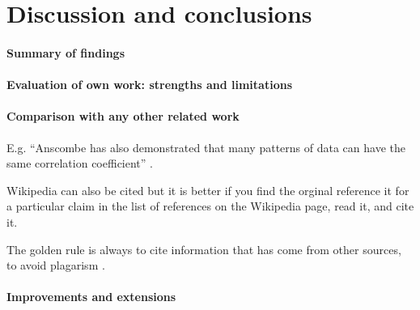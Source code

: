 \documentclass[11pt,a4paper]{article}
\begin{document}
\section{Discussion and conclusions}

\paragraph{Summary of findings}

\paragraph{Evaluation of own work: strengths and limitations}

\paragraph{Comparison with any other related work}
E.g. ``Anscombe has also demonstrated that many patterns of data can
have the same correlation coefficient'' \cite{Ansc73Grap}.

Wikipedia can also be cited but it is better if you find the orginal
reference it for a particular claim in the list of references on the
Wikipedia page, read it, and cite it.

The golden rule is always to cite information that has come from other
sources, to avoid plagarism \cite{wiki:plagarism}.

\paragraph{Improvements and extensions}



\end{document}
